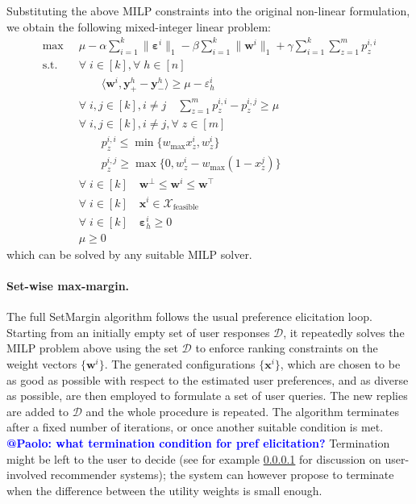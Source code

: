 \documentclass{article}
\renewcommand\[{\begin{equation}}
\renewcommand\]{\end{equation}}
\newcommand{\calvar}[1]{\ensuremath{\mathcal{#1}}}
\newcommand{\calD}{\calvar{D}}
\newcommand{\calX}{\calvar{X}}
\newcommand{\vecvar}[1]{\ensuremath{\boldsymbol{#1}}}
\newcommand{\vw}{\vecvar{w}}
\newcommand{\vx}{\vecvar{x}}
\newcommand{\vy}{\vecvar{y}}
\newcommand{\veps}{\vecvar{\varepsilon}}
\newcommand{\andrea}[1]{{\bf \textcolor{blue}{{\fbox{Andrea:} #1}}}}
\begin{document}
Substituting the above MILP constraints into the original non-linear
formulation, we obtain the following mixed-integer linear problem:
%
{\footnotesize
\begin{align}
    \max
        & \;\; \mu - \alpha \sum_{i=1}^k \| \veps^{i} \|_1 - \beta \sum_{i=1}^k \| \vw^{i} \|_1 + \gamma \sum_{i=1}^k \sum_{z=1}^m p^{i,i}_z
        \nonumber
    \\
    \text{s.t.}
        & \;\; \forall \; i \in [k], \forall \; h \in [n] \nonumber
    \\
        & \;\; \qquad \langle \vw^{i}, \vy^{h}_+ - \vy^{h}_- \rangle \ge \mu - \varepsilon^{i}_h \nonumber
    \\
        & \;\; \forall \; i, j \in [k], i \neq j \quad \sum_{z=1}^m p^{i,i}_z - p^{i,j}_z \ge \mu
    \\
        & \;\; \forall \; i, j \in [k], i \neq j, \forall \; z \in [m] \nonumber
    \\
        & \;\; \qquad p^{i,i}_z \le \min \{ w_\text{max} x^{i}_z, w^{i}_z \}
    \\
        & \;\; \qquad p^{i,j}_z \ge \max \{ 0, w^{i}_z - w_\text{max}(1 - x^{j}_z) \}
    \\
        & \;\; \forall \; i \in [k] \quad \vw^\bot \le \vw^{i} \le \vw^\top \label{eq:wbounds2}
    \\
        & \;\; \forall \; i \in [k] \quad \vx^{i} \in \calX_{\text{feasible}} \nonumber
    \\
        & \;\; \forall \; i \in [k] \quad \veps^{i}_h \ge 0 \nonumber
    \\
        & \;\; \mu \ge 0 \nonumber
\end{align}
}
%
which can be solved by any suitable MILP solver.

\paragraph{Set-wise max-margin.} The full {\sc SetMargin} algorithm
follows the usual preference elicitation loop. Starting from an
initially empty set of user responses $\calD$, it repeatedly solves
the MILP problem above using the set $\calD$ to enforce ranking
constraints on the weight vectors $\{\vw^i\}$. The generated
configurations $\{\vx^i\}$, which are chosen to be as good as possible
with respect to the estimated user preferences, and as diverse as
possible, are then employed to formulate a set of user queries. The
new replies are added to $\calD$ and the whole procedure is
repeated. The algorithm terminates after a fixed number of iterations,
or once another suitable condition is met. \andrea{@Paolo: what termination
condition for pref elicitation?}  
Termination might be left to the user to decide (see for example \ref{} for discussion on user-involved recommender systems); the system can however propose
to terminate when the difference between the utility weights is small enough.
\end{document}
